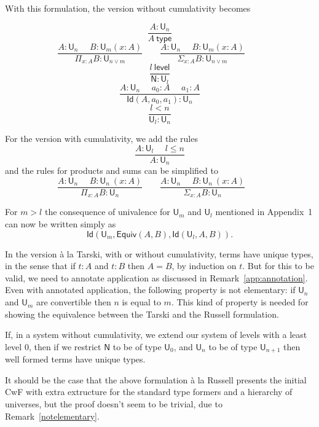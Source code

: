 \documentclass[a4paper,UKenglish,cleveref, autoref, thm-restate]{lipics-v2021}
\newcommand{\Id}{\mathsf{Id}}
\newcommand{\NN}{\mathsf{N}}
\newcommand{\UU}{\mathsf{U}}
\newcommand{\Level}{\mathsf{level}}
\newcommand{\type}{\mathsf{type}}
\newcommand{\mypi}[3]{\Pi_{#1:#2}#3}
\newcommand{\mysig}[3]{\Sigma_{#1:#2}#3}
\newcommand{\Equiv}{\mathsf{Equiv}}
\begin{document}
With this formulation, the version without cumulativity becomes

$$
\frac{A:\UU_{n}}{A~\type}
$$
$$
\frac{A:\UU_{n}~~~~~~B:\UU_m(x:A)}
     {\mypi{x}{A}{B}:\UU_{n\vee m}}~~~~~~~~~
\frac{A:\UU_{n}~~~~~~B:\UU_m(x:A)}
     {\mysig{x}{A}{B}:\UU_{n\vee m}}~~~~~~~~~
$$
$$\frac{l~\Level}{\NN:\UU_{l}}$$
$$
\frac{A:\UU_n~~~~~~a_0:A~~~~~~a_1:A}{\Id(A,a_0,a_1):\UU_n}
$$
$$
\frac{l<n}{{\UU_l}:\UU_{n}}
$$

\medskip

For the version with cumulativity, we add the rules
$$
\frac{A:\UU_{l}~~~~~~l\leqslant n}{A:\UU_{n}}
$$
and the rules for products and sums can be simplified to
$$
\frac{A:\UU_{n}~~~~~~B:\UU_n~(x:A)}
     {\mypi{x}{A}{B}:\UU_{n}}~~~~~~~~~
\frac{A:\UU_{n}~~~~~~B:\UU_n~(x:A)}
     {\mysig{x}{A}{B}:\UU_{n}}~~~~~~~~~
$$

     For $m>l$ the consequence of univalence for $\UU_m$ and $\UU_l$
     mentioned in Appendix~1 can now be written
     simply as
     $$\Id(\UU_m,\Equiv(A,B),\Id(\UU_l,A,B)).$$



\begin{remark}\label{notelementary}
  In the version \`a la Tarski, with or without cumulativity, terms have unique types, in the sense that if $t : A$ and $t : B$ then $A = B$, by induction on $t$. But for this to be valid, we need to annotate application as discussed in Remark~\ref{app:annotation}.
  Even with annotated application, the following property is not elementary: if $\UU_n$ and $\UU_m$ are convertible then $n$ is equal to $m$. This kind of property is needed for showing the equivalence between the Tarski and the Russell formulation.
\end{remark}

\begin{remark} \label{uniqueness:without:cumulativity}
If, in a system without cumulativity, we extend our system of levels with a least level 0, then if we restrict $\NN$ to be of type $\UU_0$, and $\UU_n$ to be of type $\UU_{n+1}$ then well formed terms have unique types.
\end{remark}

\begin{remark}
  It should be the case that the above formulation \`a la Russell presents the initial CwF with extra extructure for the standard type formers and a hierarchy of universes, but the proof doesn't seem to be trivial, due to Remark~\ref{notelementary}.
\end{remark}
\end{document}
